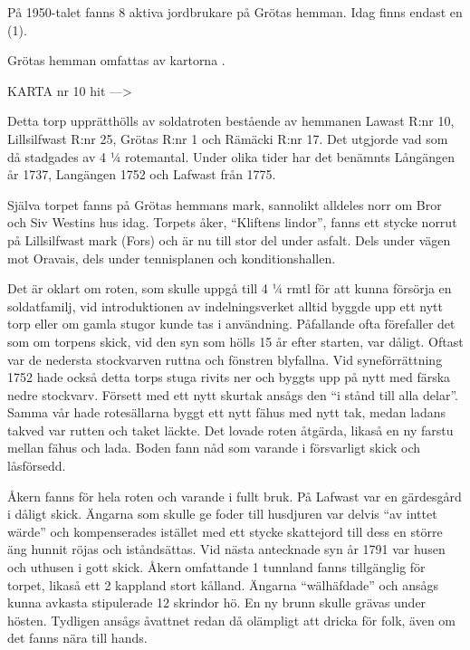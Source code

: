 På 1950-talet fanns 8 aktiva jordbrukare på Grötas hemman. Idag finns endast en (1).

Grötas hemman omfattas av kartorna .


KARTA nr 10 hit --->



Detta torp upprätthölls av soldatroten bestående av hemmanen Lawast R:nr 10, Lillsilfwast R:nr 25, Grötas R:nr 1 och Rämäcki R:nr 17. Det utgjorde vad som då stadgades av 4 ¼ rotemantal. Under olika tider har det benämnts Långängen år 1737, Langängen 1752 och Lafwast från 1775.

Själva torpet fanns på Grötas hemmans mark, sannolikt alldeles norr om Bror och Siv Westins hus idag. Torpets åker, ``Kliftens lindor'', fanns ett stycke norrut på Lillsilfwast mark (Fors) och är nu till stor del under asfalt. Dels under vägen mot Oravais, dels under tennisplanen och konditionshallen.

Det är oklart om roten, som skulle uppgå till 4 ¼ rmtl för att kunna försörja en soldatfamilj, vid introduktionen av  indelningsverket alltid byggde upp ett nytt torp eller om gamla stugor kunde tas i användning. Påfallande ofta förefaller det som om torpens skick, vid den syn som hölls 15 år efter starten, var dåligt. Oftast var de nedersta stockvarven ruttna och fönstren blyfallna. Vid syneförrättning 1752 hade också detta torps stuga rivits ner och byggts upp på nytt med färska nedre stockvarv. Försett med ett nytt skurtak ansågs den ``i stånd till alla delar''. Samma vår hade rotesällarna byggt ett nytt fähus med nytt tak, medan ladans takved var rutten och taket läckte. Det lovade roten åtgärda, likaså en ny farstu mellan fähus och lada. Boden fann nåd som varande i försvarligt skick och låsförsedd.

Åkern fanns för hela roten och varande i fullt bruk. På Lafwast var en gärdesgård i dåligt skick. Ängarna som skulle ge foder till husdjuren var delvis ``av inttet wärde'' och kompenserades istället med ett stycke skattejord till dess en större äng hunnit röjas och iståndsättas. Vid nästa antecknade syn år 1791 var husen och uthusen i gott skick. Åkern omfattande 1 tunnland fanns tillgänglig för torpet, likaså ett 2 kappland stort kålland. Ängarna ``wälhäfdade'' och ansågs kunna avkasta stipulerade 12 skrindor hö. En ny brunn skulle grävas under hösten. Tydligen ansågs åvattnet redan då olämpligt att dricka för folk, även om det fanns nära till hands.

